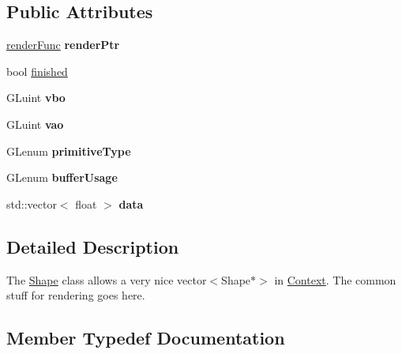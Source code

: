 \subsection*{Public Attributes}
\begin{DoxyCompactItemize}
\item 
\hyperlink{classShape_ab0227d9b119beea793bce34ba3e0b5b8}{render\+Func} {\bfseries render\+Ptr}\hypertarget{classShape_a016f40915d3586c308b3e8fdfb9d9bc5}{}\label{classShape_a016f40915d3586c308b3e8fdfb9d9bc5}

\item 
bool \hyperlink{classShape_ad766ebc1fafeb7f6c76d37ccfed88be4}{finished}
\item 
G\+Luint {\bfseries vbo}\hypertarget{classShape_a9772bed5d7baa4d326238e0abdc9d902}{}\label{classShape_a9772bed5d7baa4d326238e0abdc9d902}

\item 
G\+Luint {\bfseries vao}\hypertarget{classShape_ab0690d5f4e6d3de615e90002bc3913c7}{}\label{classShape_ab0690d5f4e6d3de615e90002bc3913c7}

\item 
G\+Lenum {\bfseries primitive\+Type}\hypertarget{classShape_ad05ed5f7c01b7d0ee1b8e5a5400aa2b7}{}\label{classShape_ad05ed5f7c01b7d0ee1b8e5a5400aa2b7}

\item 
G\+Lenum {\bfseries buffer\+Usage}\hypertarget{classShape_a9203986d2f0e566c7cf66be7478eca59}{}\label{classShape_a9203986d2f0e566c7cf66be7478eca59}

\item 
std\+::vector$<$ float $>$ {\bfseries data}\hypertarget{classShape_a540c062d8d9719147efb7723ce0ceeea}{}\label{classShape_a540c062d8d9719147efb7723ce0ceeea}

\end{DoxyCompactItemize}


\subsection{Detailed Description}
The \hyperlink{classShape}{Shape} class allows a very nice vector$<$\+Shape$\ast$$>$ in \hyperlink{classContext}{Context}. The common stuff for rendering goes here. 

\subsection{Member Typedef Documentation}
